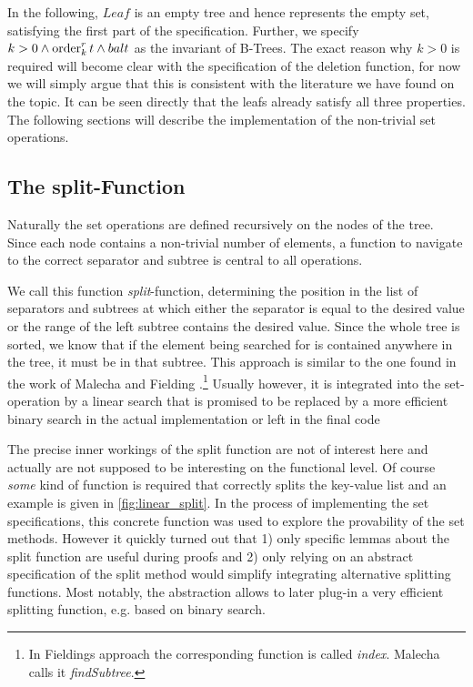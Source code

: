 In the following, $Leaf$ is an empty tree and hence represents
the empty set, satisfying the first part of the specification.
Further, we specify $k > 0 \wedge \operatorname{order}^r_k t \wedge bal t$
as the invariant of B-Trees.
The exact reason why $k > 0$ is required will become clear with the
specification of the deletion function,
for now we will simply argue that this is consistent with
the literature we have found on the topic.
It can be seen directly that the leafs already satisfy all three properties.
The following sections will describe the implementation of the
non-trivial set operations.

\subsection{The split-Function}

Naturally the set operations are defined recursively on the nodes of the tree.
Since each node contains a non-trivial number of elements,
a function to navigate to the correct separator and subtree is central to all operations.

We call this function \textit{split}-function,
determining the position in the list of separators and subtrees at which
either the separator is equal to the desired value or the range of the left subtree
contains the desired value.
Since the whole tree is sorted, we know that if the element being searched for
is contained anywhere in the tree, it must be in that subtree.
This approach is similar to the one found in the work of Malecha and Fielding \parencite{DBLP:conf/popl/MalechaMSW10,Fielding80}.\footnote{
    In Fieldings approach the corresponding function is called \textit{index}.
    Malecha calls it \textit{findSubtree}.
}
Usually however, it is integrated into the set-operation
by a linear search that is promised to be replaced by a more efficient binary search
in the actual implementation \parencite{DBLP:books/daglib/0023376,DBLP:journals/acta/BayerM72}
or left in the final code \parencite{DBLP:journals/sosym/ErnstSR15}

The precise inner workings of the split function are not of interest here
and actually are not supposed to be interesting on the functional level.
Of course \textit{some} kind of function is required that correctly splits
the key-value list and an example is given in \autoref{fig:linear_split}.
In the process of implementing the set specifications,
this concrete function was used to explore the provability of the set methods.
However it quickly turned out that 1) only specific lemmas about the split
function are useful during proofs and 2) only relying on an abstract specification of
the split method would simplify integrating alternative splitting functions.
Most notably, the abstraction allows to later plug-in a very efficient splitting
function, e.g. based on binary search.


